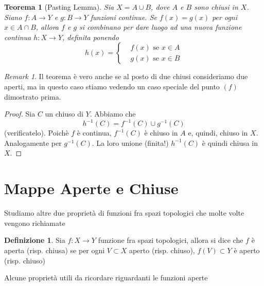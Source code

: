 \documentclass[10pt,a4paper]{article}
\theoremstyle{definition}
\newtheorem{defi}{Definizione}
\theoremstyle{plain}
\newtheorem{teo}{Teorema}
\theoremstyle{remark}
\newtheorem{rem}{Remark}
\theoremstyle{remark}
\begin{document}

\begin{teo}[Pasting Lemma] Sia $X = A \cup B$, dove $A$ e $B$ sono chiusi in
$X$. Siano $f : A \to Y$ e $g: B \to Y$ funzioni continue. Se $f(x)=g(x)$ per
ogni $x \in A \cap B$, allora $f$ e $g$ si combinano per dare luogo ad una nuova
funzione continua $h : X \to Y$, definita ponendo\[ h(x) = \begin{cases} &f(x)
\mbox{ se } x \in A \\ &g(x) \mbox{ se } x \in B
\end{cases} \]
\end{teo}

\begin{rem} Il teorema è vero anche se al posto di due chiusi consideriamo due
aperti, ma in questo caso stiamo vedendo un caso speciale del punto $(f)$
dimostrato prima. \end{rem}

\begin{proof} Sia $C$ un chiuso di $Y$. Abbiamo che \[ h^{-1}(C) = f^{-1}(C)
\cup g^{-1}(C) \] (verificatelo). Poichè $f$ è continua, $f^{-1}(C)$ è chiuso in
$A$ e, quindi, chiuso in $X$. Analogamente per $g^{-1}(C)$. La loro unione
(finita!) $h^{-1}(C)$ è quindi chiusa in $X$.
\end{proof}



\section{Mappe Aperte e Chiuse}

Studiamo altre due proprietà di funzioni fra spazi topologici che molte volte
vengono richiamate
\begin{defi} Sia $f: X \to Y$ funzione fra spazi topologici, allora si dice che
$f$ è aperta (risp. chiusa) se per ogni $V \subset X$ aperto (risp. chiuso),
$f(V) \subset Y$ è aperto (risp. chiuso)
 \end{defi}

 Alcune proprietà utili da ricordare riguardanti le funzioni aperte
\end{document}

